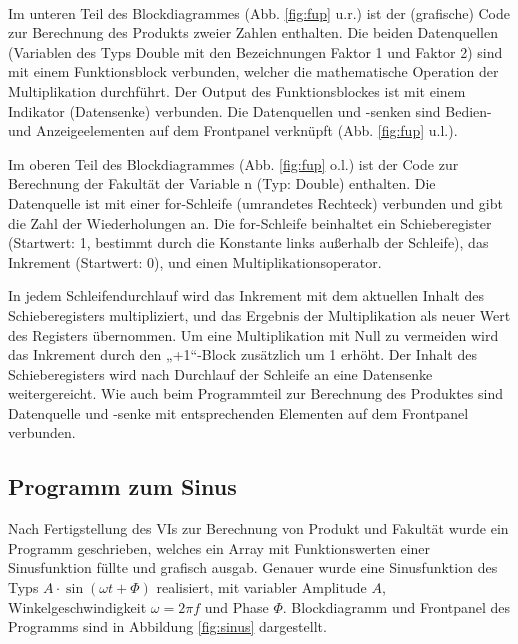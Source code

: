\

Im unteren Teil des Blockdiagrammes (Abb. \ref{fig:fup} u.r.) ist der (grafische) Code zur Berechnung des Produkts zweier Zahlen enthalten. Die beiden Datenquellen (Variablen des Typs Double mit den Bezeichnungen Faktor 1 und Faktor 2) sind mit einem Funktionsblock verbunden, welcher die mathematische Operation der Multiplikation durchführt. Der Output des Funktionsblockes ist mit einem Indikator (Datensenke) verbunden. Die Datenquellen und -senken sind Bedien- und Anzeigeelementen auf dem Frontpanel verknüpft (Abb. \ref{fig:fup} u.l.).

Im oberen Teil des Blockdiagrammes (Abb. \ref{fig:fup} o.l.) ist der Code zur Berechnung der Fakultät der Variable n (Typ: Double) enthalten. Die Datenquelle ist mit einer for-Schleife (umrandetes Rechteck) verbunden und gibt die Zahl der Wiederholungen an. Die for-Schleife beinhaltet ein Schieberegister (Startwert: 1, bestimmt durch die Konstante links außerhalb der Schleife), das Inkrement (Startwert: 0), und einen Multiplikationsoperator.

In jedem Schleifendurchlauf wird das Inkrement mit dem aktuellen Inhalt des Schieberegisters multipliziert, und das Ergebnis der Multiplikation als neuer Wert des Registers übernommen. Um eine Multiplikation mit Null zu vermeiden wird das Inkrement durch den „+1“-Block zusätzlich um 1 erhöht. Der Inhalt des Schieberegisters wird nach Durchlauf der Schleife an eine Datensenke weitergereicht. Wie auch beim Programmteil zur Berechnung des Produktes sind Datenquelle und -senke mit entsprechenden Elementen auf dem Frontpanel verbunden.

\subsection{Programm zum Sinus}

Nach Fertigstellung des VIs zur Berechnung von Produkt und Fakultät wurde ein Programm geschrieben, welches ein Array mit Funktionswerten einer Sinusfunktion füllte und grafisch ausgab. Genauer wurde eine Sinusfunktion des Typs $A\cdot \sin( \omega t + \Phi)$ realisiert, mit variabler Amplitude $A$, Winkelgeschwindigkeit $ \omega=2 \pi f$ und Phase $\Phi$. Blockdiagramm und Frontpanel des Programms sind in Abbildung \ref{fig:sinus} dargestellt.

\

